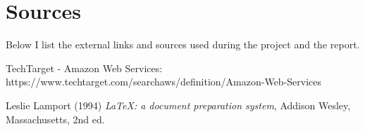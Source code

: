 \documentclass[11pt,a4paper,oneside]{report}
\begin{document}
\chapter{Sources}

Below I list the external links and sources used during the project and the report.

\begin{thebibliography}{9}
  TechTarget - Amazon Web Services: https://www.techtarget.com/searchaws/definition/Amazon-Web-Services

  Leslie Lamport (1994) \emph{\LaTeX: a document preparation system}, Addison
  Wesley, Massachusetts, 2nd ed.
\end{thebibliography}
\end{document}
